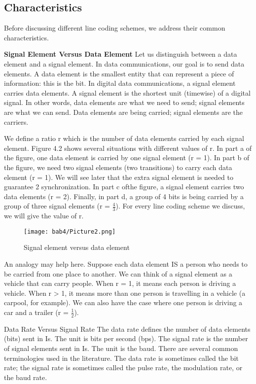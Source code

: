 \subsection*{Characteristics}
Before discussing different line coding schemes, we address their common characteristics.

\textbf{Signal Element Versus Data Element} Let us distinguish between a data element and a signal element. In data communications, our goal is to send data elements. A data element is the smallest entity that can represent a piece of information: this is the bit. In digital data communications, a signal element carries data elements. A signal element is the shortest unit (timewise) of a digital signal. In other words, data elements are what we need to send; signal elements are what we can send. Data elements are being carried; signal elements are the carriers.

We define a ratio r which is the number of data elements carried by each signal element. Figure 4.2 shows several situations with different values of r. In part a of the figure, one data element is carried by one signal element (r = 1). In part b of the figure, we need two signal elements (two transitions) to carry each data element (r = 1). We will see later that the extra signal element is needed to guarantee 2 synchronization. In part c ofthe figure, a signal element carries two data elements (r = 2). Finally, in part d, a group of 4 bits is being carried by a group of three signal elements (r = $\frac{4}{3}$). For every line coding scheme we discuss, we will give the value of r.

\begin{figure}[htbp]
  \centering
  \texttt{[image: bab4/Picture2.png]}
  \caption{Signal element versus data element}
  \label{fig4:2}
\end{figure}

An analogy may help here. Suppose each data element IS a person who needs to be carried from one place to another. We can think of a signal element as a vehicle that can carry people. When r = 1, it means each person is driving a vehicle. When r > 1, it means more than one person is travelling in a vehicle (a carpool, for example). We can also have the case where one person is driving a car and a trailer (r = $\frac{1}{2}$).

Data Rate Versus Signal Rate The data rate defines the number of data elements (bits) sent in Is. The unit is bits per second (bps). The signal rate is the number of signal elements sent in Is. The unit is the baud. There are several common terminologies used in the literature. The data rate is sometimes called the bit rate; the signal rate is sometimes called the pulse rate, the modulation rate, or the baud rate.

